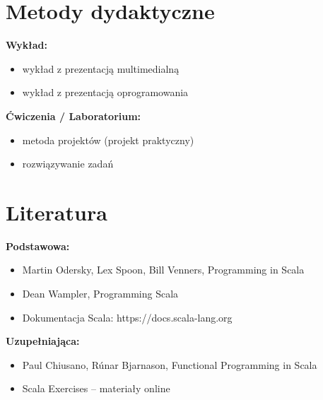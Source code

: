 \documentclass[12pt, a4paper]{article}
\begin{document}
\section{Metody dydaktyczne}

\textbf{Wykład:}
\begin{itemize}
  \item wykład z prezentacją multimedialną
  \item wykład z prezentacją oprogramowania
\end{itemize}
\vspace{4pt}
\textbf{Ćwiczenia / Laboratorium:}
\begin{itemize}
  \item metoda projektów (projekt praktyczny)
  \item rozwiązywanie zadań
\end{itemize}
\vspace{4pt}


\section{Literatura}

\textbf{Podstawowa:}
\begin{itemize}
  \item Martin Odersky, Lex Spoon, Bill Venners, Programming in Scala
  \item Dean Wampler, Programming Scala
  \item Dokumentacja Scala: https://docs.scala-lang.org
\end{itemize}

\textbf{Uzupełniająca:}
\begin{itemize}
  \item Paul Chiusano, Rúnar Bjarnason, Functional Programming in Scala
  \item Scala Exercises – materiały online
\end{itemize}
\end{document}
